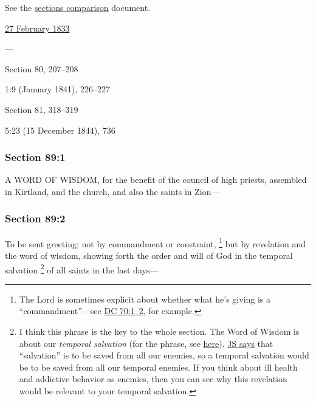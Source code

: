 		See the \href{https://drive.google.com/file/d/1goAvNz8jS4R8slYfMG_db55Ty2z_vmgK/view?usp=sharing}{sections comparison} document.
	
		\begin{compactdesc}
			\item[JSP] \hyperref[EMS-1833-JS-27-FEB-1833]{27 February 1833}
			\item[BC] ---
			\item[DC 1835] Section 80, 207--208
			\item[MS] 1:9 (January 1841), 226--227
			\item[DC 1844] Section 81, 318--319
			\item[TS] 5:23 (15 December 1844), 736
		\end{compactdesc}

	\subsubsection{Section 89:1} %
		\label{DC89-1}

		A WORD OF WISDOM, for the benefit of the council of high priests, assembled in Kirtland, and the church, and also the saints in Zion---


	\subsubsection{Section 89:2} %
		\label{DC89-2}

		To be sent greeting; not by commandment or constraint,%
			\footnote{%
				The Lord is sometimes explicit about whether what he's giving is a ``commandment''---see \hyperref[DC70-1]{DC 70:1--2}, for example.
				}
		but by revelation and the word of wisdom, showing forth the order and will of God in the temporal salvation%
			\footnote{%
				I think this phrase is the key to the whole section. The Word of Wisdom is about our \textit{temporal salvation} (for the phrase, see \hyperref[SALVATION-PHRASES]{here}). \hyperref[SALVATION-JS]{JS says} that ``salvation'' is to be saved from all our enemies, so a temporal salvation would be to be saved from all our temporal enemies. If you think about ill health and addictive behavior as enemies, then you can see why this revelation would be relevant to your temporal salvation.
				}
		of all saints in the last days---

